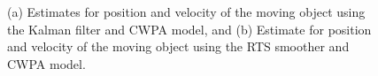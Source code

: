 \begin{figure}[t]
 \centering
 \hspace{0.2cm}
 \caption{(a) Estimates for position and velocity of the moving object
  using the Kalman filter and CWPA model, and (b) Estimate for position and velocity of the moving object using the RTS smoother and CWPA model.}
 \label{fig:example1_2-3}
\end{figure}










